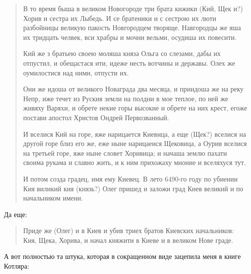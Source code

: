 \begin{quotation}
В то время быша в великом Новогороде три брата кижики (Кий, Щек и?) Хорив и сестра их Лыбедь. И се братеники и с сестрою их люти разбойницы великую пакость Новгородцем творяще. Навгородцы же яша их тридцать челвек, вси храбры и мочни вельми, осудиша их повесити. 

Кий же з братьею своею моляша княза Ольга со слезами, дабы их отпустил, и обещастася ити, идеже несть вотчины и державы. Олех же оумилостися над ними, отпусти их. 

Они же идоша от великого Новаграда два месяца, и приидоша же на реку Непр, иже течет из Руския земли на полдни в мое теплое, по ней же живяху Варяхи, и обрете некие горы высокие и обрете на них крест, егоже постави апостол Христов Ондрей Первозванный. 

И вселися Кий на горе, яже нарицается Киевица, а еще (Щек?) вселися на другой горе близ его же, еже ныне нарицаеися Щековица, а Оурив вселися на третьей горе, яже ныне словет Хоривица; и начаша землю пахати своима рукама и славно жить, и к ним прихожаху мноние и вселяхуся тут. 

И потом созда градец, имя ему Киевец. В лето 6490-го году по убиении Кия виликий кия (князь?) Олег пришед и заложи град Киев великий и по начальником имени.
\end{quotation}

Да еще:

\begin{quotation}
Приде же (Олег) и в Киев и убив триех братов Киевских начальников: Кия, Щека, Хорива, и начал княжити в Киеве и в великом Нове граде.
\end{quotation}

А вот полностью та штука, которая в сокращенном виде зацепила меня в книге Котляра:

